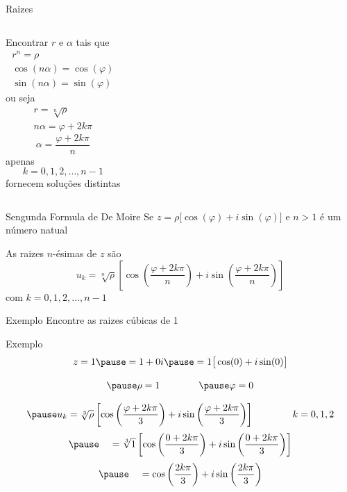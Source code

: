 \begin{frame}{Raizes}
\begin{columns}
  Encontrar $r$ e $\alpha$
  \pause
   tais que
  \begin{gather*}
    r^n = \rho \\
    \cos(n\alpha) = \cos(\varphi) \\
    \sin(n\alpha) = \sin(\varphi)
  \end{gather*}
  \pause
  ou seja
  \begin{gather*}
    r=\sqrt[n]{\rho} \\
    n\alpha = \varphi + 2k\pi
  \end{gather*}
  \pause
  \[
    \alpha = \frac{\varphi + 2k\pi}{n}
  \]
  \pause
  apenas
  \[
    k = 0, 1, 2, \dots, n-1
  \]
  fornecem soluções distintas
\end{columns}
\end{frame}

\begin{frame}{Sengunda Formula de De Moire}
  Se
  \(
    z = \rho \big[\cos(\varphi) + i\sin(\varphi)\big]
  \)
  e $n>1$ é um número natual

  \vspace{\baselineskip}
  As raizes $n$-ésimas de $z$ são
  \[
    u_k = \sqrt[n]{\rho}
    \left[
         \cos\left(\frac{\varphi+2k\pi}{n}\right)
      + i\sin\left(\frac{\varphi+2k\pi}{n}\right)
    \right]
  \]
  com \(k=0, 1, 2, \dots, n-1\)
\end{frame}

\addtocounter{exemplo}{1}
\begin{frame}{Exemplo \theexemplo}
  Encontre as raizes cúbicas de 1
\end{frame}

\begin{frame}{Exemplo \theexemplo}
  \[
    z = 1
    \pause
    = 1 + 0i
    \pause
    = 1\big[\cos(0) + i\sin(0)\big]
  \]

  \[
    \pause
    \rho = 1
    \qquad\qquad
    \pause
    \varphi = 0
  \]

  \[
    \pause
    u_k = \sqrt[3]{\rho}
    \left[
       \cos\left(\frac{\varphi+2k\pi}{3}\right)
    + i\sin\left(\frac{\varphi+2k\pi}{3}\right)
    \right]
    \qquad\qquad
    k=0, 1, 2
  \]
  \[
    \pause
    \hphantom{u_k}
    = \sqrt[3]{1}
    \left[
    \cos\left(\frac{0+2k\pi}{3}\right)
    + i\sin\left(\frac{0+2k\pi}{3}\right)
    \right]
  \]
  \[
    \pause
    \hphantom{u_k}
    =  \cos\left(\frac{2k\pi}{3}\right)
    + i\sin\left(\frac{2k\pi}{3}\right)
  \]
\end{frame}

